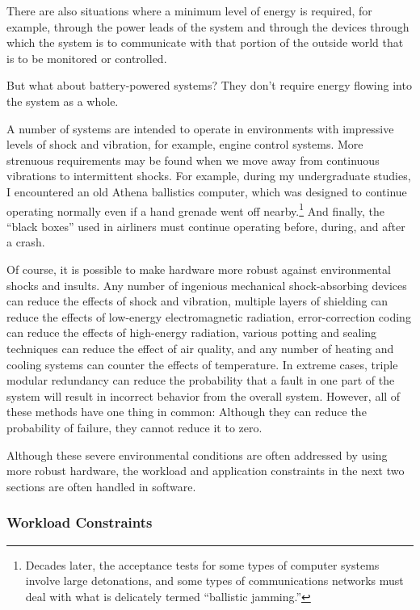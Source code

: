 There are also situations where a minimum level of energy
is required, for example, through the power leads of the system and
through the devices through which the system is to communicate with
that portion of the outside world that is to be monitored or controlled.

\QuickQuiz{}
	But what about battery-powered systems?
	They don't require energy flowing into the system as a whole.
 \QuickQuizEnd

A number of systems are intended to operate in environments with impressive
levels of shock and vibration, for example, engine control systems.
More strenuous requirements may be found when we move away from
continuous vibrations to intermittent shocks.
For example, during my undergraduate studies, I encountered an old Athena
ballistics computer, which was designed to continue operating normally even if
a hand grenade went off nearby.\footnote{
	Decades later, the acceptance tests for some types of computer
	systems involve large detonations, and some types of
	communications networks must deal with what is delicately
	termed ``ballistic jamming.''}
And finally, the ``black boxes'' used in airliners must continue operating
before, during, and after a crash.

Of course, it is possible to make hardware more robust against
environmental shocks and insults.
Any number of ingenious mechanical shock-absorbing devices can reduce the
effects of shock and vibration, multiple layers of shielding can reduce
the effects of low-energy electromagnetic radiation, error-correction
coding can reduce the effects of high-energy radiation, various potting
and sealing techniques can reduce the effect of air quality, and any
number of heating and cooling systems can counter the effects of temperature.
In extreme cases, triple modular redundancy can reduce the probability that
a fault in one part of the system will result in incorrect behavior from
the overall system.
However, all of these methods have one thing in common:  Although they
can reduce the probability of failure, they cannot reduce it to zero.

Although these severe environmental conditions are often addressed by using
more robust hardware, the
workload and application constraints in the next two sections are often
handled in software.

\subsubsection{Workload Constraints}
\label{sec:rt:Workload Constraints}

